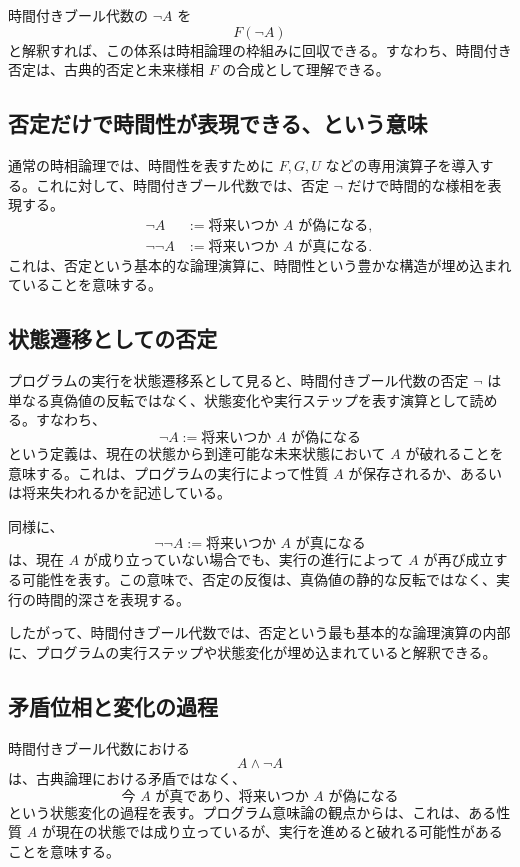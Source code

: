 \documentclass[10pt]{ltjsarticle}
\begin{document}
時間付きブール代数の $\neg A$ を
\[
  F(\neg A)
\]
と解釈すれば、この体系は時相論理の枠組みに回収できる。すなわち、時間付き否定は、古典的否定と未来様相 $F$ の合成として理解できる。

\subsection{否定だけで時間性が表現できる、という意味}

通常の時相論理では、時間性を表すために $F, G, U$ などの専用演算子を導入する。これに対して、時間付きブール代数では、否定 $\neg$ だけで時間的な様相を表現する。
\begin{align*}
  \neg A &:= \text{将来いつか $A$ が偽になる}, \\
  \neg\neg A &:= \text{将来いつか $A$ が真になる}.
\end{align*}
これは、否定という基本的な論理演算に、時間性という豊かな構造が埋め込まれていることを意味する。

\subsection{状態遷移としての否定}

プログラムの実行を状態遷移系として見ると、時間付きブール代数の否定 $\neg$ は単なる真偽値の反転ではなく、状態変化や実行ステップを表す演算として読める。すなわち、
\[
  \neg A := \text{将来いつか $A$ が偽になる}
\]
という定義は、現在の状態から到達可能な未来状態において $A$ が破れることを意味する。これは、プログラムの実行によって性質 $A$ が保存されるか、あるいは将来失われるかを記述している。

同様に、
\[
  \neg\neg A := \text{将来いつか $A$ が真になる}
\]
は、現在 $A$ が成り立っていない場合でも、実行の進行によって $A$ が再び成立する可能性を表す。この意味で、否定の反復は、真偽値の静的な反転ではなく、実行の時間的深さを表現する。

したがって、時間付きブール代数では、否定という最も基本的な論理演算の内部に、プログラムの実行ステップや状態変化が埋め込まれていると解釈できる。

\subsection{矛盾位相と変化の過程}

時間付きブール代数における
\[
  A \land \neg A
\]
は、古典論理における矛盾ではなく、
\[
  \text{今 $A$ が真であり、将来いつか $A$ が偽になる}
\]
という状態変化の過程を表す。プログラム意味論の観点からは、これは、ある性質 $A$ が現在の状態では成り立っているが、実行を進めると破れる可能性があることを意味する。
\end{document}
